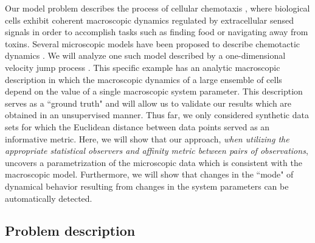 \documentclass[3p]{elsarticle}
\begin{document}
Our model problem describes the process of cellular chemotaxis \cite{othmer2000diffusion}, 
where biological cells exhibit coherent macroscopic dynamics regulated by extracellular sensed signals 
in order to accomplish tasks such as finding food or navigating away from toxins.
%
Several microscopic models have been proposed to describe chemotactic dynamics \cite{othmer1988models, codling2008random}.
%
We will analyze one such model described by a one-dimensional velocity jump process \cite{othmer2000diffusion}.
%
This specific example has an analytic macroscopic description in which the macroscopic 
dynamics of a large ensemble of cells depend on the value of a single macroscopic system parameter.
%
This description serves as a ``ground truth" and will allow us to validate our results which are obtained in an unsupervised manner.
%
Thus far, we only considered synthetic data sets for which the Euclidean distance between data points served as an informative metric.
%
Here, we will show that our approach, {\em when utilizing the appropriate statistical observers and affinity metric between pairs of observations}, 
uncovers a parametrization of the microscopic data which is consistent with the macroscopic model.
%
Furthermore, we will show that changes in the ``mode" of dynamical behavior resulting from changes in the system parameters can be automatically detected.

\subsection{Problem description}
\end{document}
